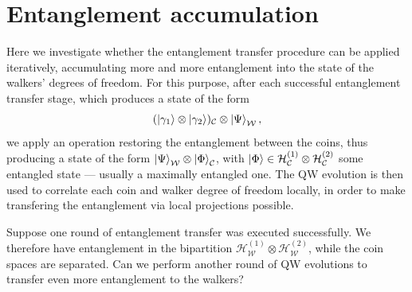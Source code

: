 \documentclass[
	aps, pra,
	superscriptaddress, twocolumn,
	floatfix,
	10pt
]{revtex4-1}
\newcommand{\parTitle}[1]{\noindent{\color{Mahogany}(\emph{#1})}}
\newcommand{\calC}{{\mathcal{C}}}
\newcommand{\calH}{{\mathcal{H}}}
\newcommand{\calW}{{\mathcal{W}}}
\newcommand{\HC}{\calH_\calC}
\newcommand{\HW}{\calH_\calW}
\renewcommand{\parTitle}[1]{}
\begin{document}
\section{Entanglement accumulation}
\label{sec:entanglement_accumulation}

\parTitle{Section overview}
Here we investigate whether the entanglement transfer procedure can be applied iteratively, accumulating more and more entanglement into the state of the walkers' degrees of freedom.
For this purpose, after each successful entanglement transfer stage, which produces a state of the form
\begin{equation}
	(\ket{\gamma_1}\otimes\ket{\gamma_2})_{\calC}\otimes \ket{\Psi}_{\calW},
\end{equation}
we apply an operation restoring the entanglement between the coins, thus producing a state of the form
	$\ket{\Psi}_{\calW}\otimes\ket{\Phi}_{\calC}$,
with $\ket{\Phi}\in\HC^{(1)}\otimes\HC^{(2)}$ some entangled state --- usually a maximally entangled one.
The QW evolution is then used to correlate each coin and walker degree of freedom locally, in order to make transfering the entanglement via local projections possible.

\parTitle{Output of single round of entanglement transfer}
Suppose one round of entanglement transfer was executed successfully.
We therefore have entanglement in the bipartition $\HW^{(1)}\otimes\HW^{(2)}$, while the coin spaces are separated.
Can we perform another round of QW evolutions to transfer even more entanglement to the walkers?
\end{document}
